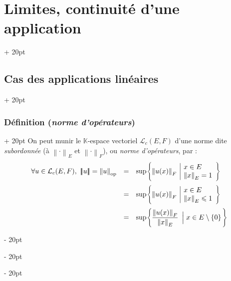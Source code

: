 \documentclass[a4paper, 12pt, twoside]{article}
\newcommand{\K}{\mathbb K}
\newcommand{\set}[1]{\left\{ #1 \right\}}
\newcommand{\norm}[1]{\left\lVert #1 \right\rVert}
\newcommand{\nnorm}[2][-2pt]{{\left\lvert \kern#1 \left\lvert \kern#1 \left\lvert #2 \right\rvert \kern#1 \right\rvert \kern#1 \right\rvert}}
\renewcommand{\le}{\leqslant}
\newcommand{\ind}[1][20pt]{\advance\leftskip + #1}
\newcommand{\deind}[1][20pt]{\advance\leftskip - #1}
\newenvironment{indt}[2][20pt]{#2 \par \ind[#1]}{\par \deind} %
\begin{document}
\begin{indt}{\section{Limites, continuité d'une application}}
\begin{indt}{\subsection{Cas des applications linéaires}}
            \begin{indt}{\subsubsection{Définition (\textit{norme d'opérateurs})}}
                On peut munir le $\K$-espace vectoriel $\mathcal L_c(E, F)$ d'une norme dite \emph{subordonnée} (à $\norm \cdot _E$ et $\norm \cdot _F$), ou \emph{norme d'opérateurs}, par :
                \[
                    \begin{array}{rcl}
                        \forall u \in \mathcal L_c(E, F),\
                        \nnorm u
                        =
                        \norm u _{\rm op}
                        &=&
                        \sup\!\set{
                            \norm{u(x)}_F\
                            \begin{array}{|l}
                                x \in E
                                \\
                                \norm x _E = 1
                            \end{array}
                            \vphantom{\dfrac a {\tfrac a a}}
                        }
                        \vspace{6pt}
                        \\
                        &=&
                        \sup\!\set{
                            \norm{u(x)}_F\
                            \begin{array}{|l}
                                x \in E
                                \\
                                \norm x _E \le 1
                            \end{array}
                            \vphantom{\dfrac a {\tfrac a a}}
                        }
                        \vspace{6pt}
                        \\
                        &=&
                        \sup\!\set{
                            \dfrac{\norm{u(x)}_F}{\norm x _E}\
                            \left| \vphantom{\dfrac a a}\right.
                            x \in E \setminus \set 0
                            \vphantom{\dfrac a {\tfrac a a}}
                        }
                    \end{array}
                \]

                \vspace{6pt}
                

\end{indt}
\end{indt}
\end{indt}
\end{document}
